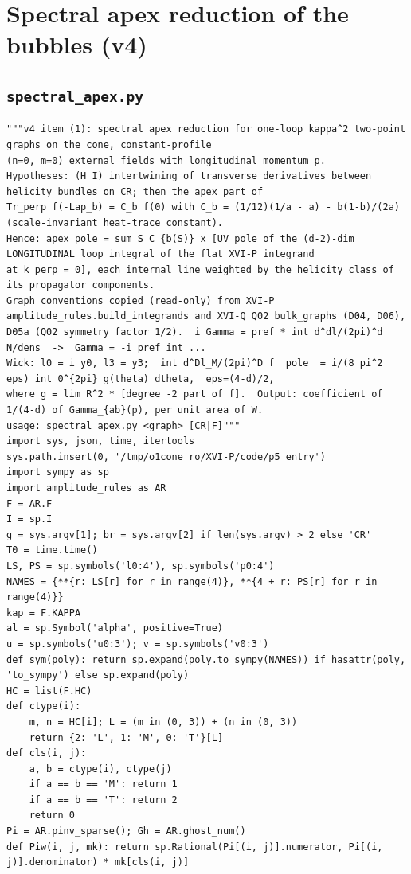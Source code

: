 \documentclass[10pt]{article}
\begin{document}
\section{Spectral apex reduction of the bubbles (v4)}
\subsection{\texttt{spectral\_apex.py}}
\begin{lstlisting}
"""v4 item (1): spectral apex reduction for one-loop kappa^2 two-point graphs on the cone, constant-profile
(n=0, m=0) external fields with longitudinal momentum p.
Hypotheses: (H_I) intertwining of transverse derivatives between helicity bundles on CR; then the apex part of
Tr_perp f(-Lap_b) = C_b f(0) with C_b = (1/12)(1/a - a) - b(1-b)/(2a)  (scale-invariant heat-trace constant).
Hence: apex pole = sum_S C_{b(S)} x [UV pole of the (d-2)-dim LONGITUDINAL loop integral of the flat XVI-P integrand
at k_perp = 0], each internal line weighted by the helicity class of its propagator components.
Graph conventions copied (read-only) from XVI-P amplitude_rules.build_integrands and XVI-Q Q02 bulk_graphs (D04, D06),
D05a (Q02 symmetry factor 1/2).  i Gamma = pref * int d^dl/(2pi)^d N/dens  ->  Gamma = -i pref int ...
Wick: l0 = i y0, l3 = y3;  int d^Dl_M/(2pi)^D f  pole  = i/(8 pi^2 eps) int_0^{2pi} g(theta) dtheta,  eps=(4-d)/2,
where g = lim R^2 * [degree -2 part of f].  Output: coefficient of 1/(4-d) of Gamma_{ab}(p), per unit area of W.
usage: spectral_apex.py <graph> [CR|F]"""
import sys, json, time, itertools
sys.path.insert(0, '/tmp/o1cone_ro/XVI-P/code/p5_entry')
import sympy as sp
import amplitude_rules as AR
F = AR.F
I = sp.I
g = sys.argv[1]; br = sys.argv[2] if len(sys.argv) > 2 else 'CR'
T0 = time.time()
LS, PS = sp.symbols('l0:4'), sp.symbols('p0:4')
NAMES = {**{r: LS[r] for r in range(4)}, **{4 + r: PS[r] for r in range(4)}}
kap = F.KAPPA
al = sp.Symbol('alpha', positive=True)
u = sp.symbols('u0:3'); v = sp.symbols('v0:3')
def sym(poly): return sp.expand(poly.to_sympy(NAMES)) if hasattr(poly, 'to_sympy') else sp.expand(poly)
HC = list(F.HC)
def ctype(i):
    m, n = HC[i]; L = (m in (0, 3)) + (n in (0, 3))
    return {2: 'L', 1: 'M', 0: 'T'}[L]
def cls(i, j):
    a, b = ctype(i), ctype(j)
    if a == b == 'M': return 1
    if a == b == 'T': return 2
    return 0
Pi = AR.pinv_sparse(); Gh = AR.ghost_num()
def Piw(i, j, mk): return sp.Rational(Pi[(i, j)].numerator, Pi[(i, j)].denominator) * mk[cls(i, j)]

\end{lstlisting}
\end{document}

